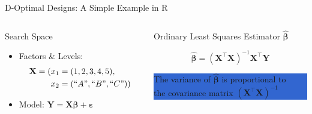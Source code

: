 \documentclass[10pt, compress, aspectratio=169, xcolor={table,usenames,dvipsnames}]{beamer}
\begin{document}
\begin{frame}[label={sec:orgbb2ce9f}]{D-Optimal Designs: A Simple Example in R}
\begin{columns}
\begin{column}{0.5\columnwidth}
\begin{block}{Search Space}
\begin{itemize}
\item Factors \& Levels:
\begin{align*}
\mathbf{X} = (x_1 = & \; (1, 2, 3, 4, 5), \\
x_2 = & \; (``A", ``B", ``C"))
\end{align*}
\item Model: \(\mathbf{Y} = \mathbf{X}\bm{\beta} + \bm{\varepsilon}\)
\end{itemize}
\end{block}
\end{column}

\begin{column}{0.5\columnwidth}
\begin{block}{Ordinary Least Squares Estimator \(\bm{\hat{\beta}}\)}
\begin{center}
\begin{equation*}
\bm{\hat{\beta}} = \left(\bm{X}^{\intercal}\bm{X}\right)^{-1}\bm{X}^{\intercal}\bm{Y}
\end{equation*}
\end{center}

\begin{center}
\colorbox{Highlight}{\parbox[c]{0.8\columnwidth}{\centering The \alert{variance} of $\bm{\hat{\beta}}$ is proportional to \\
    the \alert{covariance matrix} $\left(\bm{X}^{\intercal}\bm{X}\right)^{-1}$}}
\end{center}
\end{block}
\end{column}
\end{columns}
\end{frame}
\end{document}
